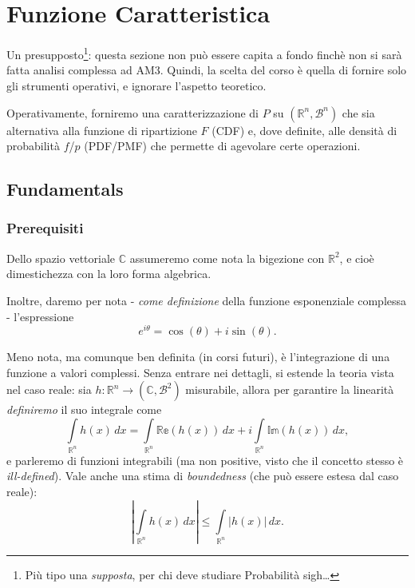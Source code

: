 
\chapter{Funzione Caratteristica}

Un presupposto\footnote{Più tipo una \textit{supposta}, per chi deve studiare Probabilità  sigh\dots}: questa sezione non può essere capita a fondo finchè non si sarà fatta analisi complessa ad AM3. Quindi, la scelta del corso è quella di fornire solo gli strumenti operativi, e ignorare l'aspetto teoretico.

Operativamente, forniremo una caratterizzazione di $P$ su $(\mathbb{R}^n,\mathcal{B}^n)$ che sia alternativa alla funzione di ripartizione $F$ (CDF) e, dove definite, alle densità di probabilità $f$/$p$ (PDF/PMF) che permette di agevolare certe operazioni.

\section{Fundamentals}

\subsection{Prerequisiti}

Dello spazio vettoriale $\mathbb{C}$ assumeremo come nota la bigezione con $\mathbb{R}^2$, e cioè dimestichezza con la loro forma algebrica.

Inoltre, daremo per nota - \textit{come definizione} della funzione esponenziale complessa - l'espressione
\[
	e^{i\theta} = \cos(\theta) + i\sin(\theta).	
\]

Meno nota, ma comunque ben definita (in corsi futuri), è l'integrazione di una funzione a valori complessi.
Senza entrare nei dettagli, si estende la teoria vista nel caso reale: sia $h:\mathbb{R}^n \to (\mathbb{C},\mathcal{B}^2)$ misurabile, allora per garantire la linearità \textit{definiremo} il suo integrale come
\[
	\int \limits_{\mathbb{R}^n} h(x) \, dx = \int \limits_{\mathbb{R}^n} \mathbb{Re}(h(x)) \, dx + i \int \limits_{\mathbb{R}^n} \mathbb{Im}(h(x)) \, dx,
\]
e parleremo di funzioni integrabili (ma non positive, visto che il concetto stesso è \textit{ill-defined}).
Vale anche una stima di \textit{boundedness} (che può essere estesa dal caso reale):
\[
	\left| \int \limits_{\mathbb{R}^n} h(x) \, dx \right| \leq \int \limits_{\mathbb{R}^n} \left|h(x)\right| \, dx.
\]

